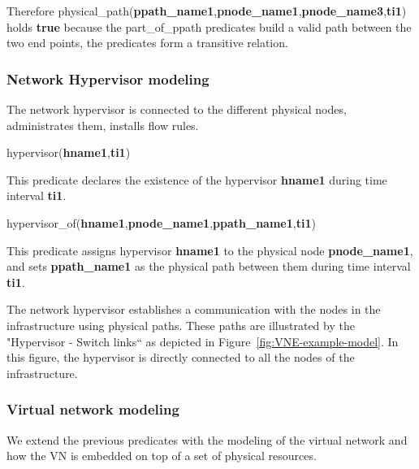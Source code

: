 Therefore physical\_path(\textbf{ppath\_name1},\textbf{pnode\_name1},\textbf{pnode\_name3},\textbf{ti1}) holds \textbf{true} because the part\_of\_ppath predicates build a valid path between the two end points, \eg the predicates form a transitive relation. 









\subsubsection{Network Hypervisor modeling}
The network hypervisor is connected to the different physical nodes, administrates them, installs flow rules.

\begin{myformula}
hypervisor(\textbf{hname1},\textbf{ti1})
\end{myformula}

This predicate declares the existence of the hypervisor \textbf{hname1} during time interval \textbf{ti1}.

\begin{myformula}
hypervisor\_of(\textbf{hname1},\textbf{pnode\_name1},\textbf{ppath\_name1},\textbf{ti1})
\end{myformula}

This predicate assigns hypervisor \textbf{hname1} to the physical node \textbf{pnode\_name1}, and sets \textbf{ppath\_name1} as the physical path between them during time interval \textbf{ti1}.

The network hypervisor establishes a communication with the nodes in the infrastructure using physical paths.
These paths are illustrated by the "Hypervisor - Switch links`` as depicted in Figure~\ref{fig:VNE-example-model}.
In this figure, the hypervisor is directly connected to all the nodes of the infrastructure.



\subsubsection{Virtual network modeling}
We extend the previous predicates with the modeling of the virtual network and how the VN is embedded on top of a set of physical resources.

